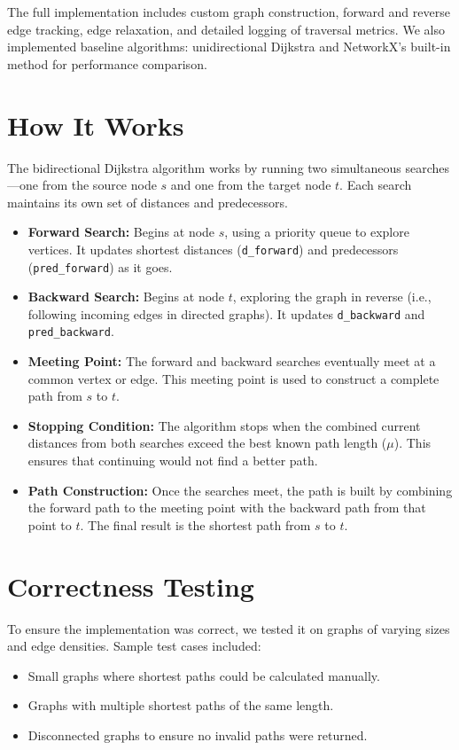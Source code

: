 \documentclass[12pt]{article}
\begin{document}
The full implementation includes custom graph construction, forward and reverse edge tracking, edge relaxation, and detailed logging of traversal metrics. We also implemented baseline algorithms: unidirectional Dijkstra and NetworkX's built-in method for performance comparison.

\section{How It Works}
\label{sec:algo}
The bidirectional Dijkstra algorithm works by running two simultaneous searches—one from the source node \( s \) and one from the target node \( t \). Each search maintains its own set of distances and predecessors.

\begin{itemize}
    \item \textbf{Forward Search:} Begins at node \( s \), using a priority queue to explore vertices. It updates shortest distances (\texttt{d\_forward}) and predecessors (\texttt{pred\_forward}) as it goes.
    
    \item \textbf{Backward Search:} Begins at node \( t \), exploring the graph in reverse (i.e., following incoming edges in directed graphs). It updates \texttt{d\_backward} and \texttt{pred\_backward}.

    \item \textbf{Meeting Point:} The forward and backward searches eventually meet at a common vertex or edge. This meeting point is used to construct a complete path from \( s \) to \( t \).

    \item \textbf{Stopping Condition:} The algorithm stops when the combined current distances from both searches exceed the best known path length (\( \mu \)). This ensures that continuing would not find a better path.

    \item \textbf{Path Construction:} Once the searches meet, the path is built by combining the forward path to the meeting point with the backward path from that point to \( t \). The final result is the shortest path from \( s \) to \( t \).
\end{itemize}

\section{Correctness Testing}
To ensure the implementation was correct, we tested it on graphs of varying sizes and edge densities. Sample test cases included:
\begin{itemize}
    \item Small graphs where shortest paths could be calculated manually.
    \item Graphs with multiple shortest paths of the same length.
    \item Disconnected graphs to ensure no invalid paths were returned.
\end{itemize}
\end{document}
